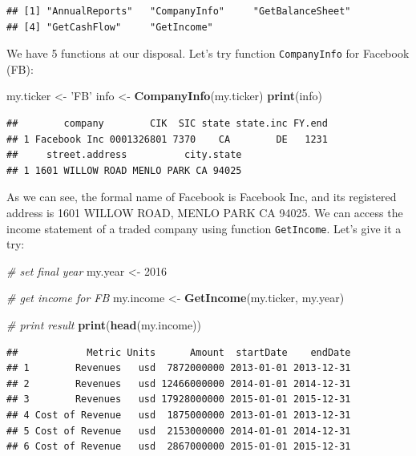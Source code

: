 \documentclass[11pt,]{book}
\newenvironment{Shaded}{\begin{snugshade}}{\end{snugshade}}
\newcommand{\KeywordTok}[1]{\textcolor[rgb]{0.27,0.27,0.27}{\textbf{#1}}}
\newcommand{\DecValTok}[1]{\textcolor[rgb]{0.06,0.06,0.06}{#1}}
\newcommand{\StringTok}[1]{\textcolor[rgb]{0.5,0.5,0.5}{#1}}
\newcommand{\CommentTok}[1]{\textcolor[rgb]{0.56,0.35,0.01}{\textit{#1}}}
\newcommand{\NormalTok}[1]{#1}
\begin{document}
\begin{verbatim}
## [1] "AnnualReports"   "CompanyInfo"     "GetBalanceSheet"
## [4] "GetCashFlow"     "GetIncome"
\end{verbatim}

We have 5 functions at our disposal. Let's try function
\texttt{CompanyInfo} for Facebook (FB):

\begin{Shaded}
\begin{Highlighting}[]
\NormalTok{my.ticker <-}\StringTok{ 'FB'}
\NormalTok{info <-}\StringTok{ }\KeywordTok{CompanyInfo}\NormalTok{(my.ticker)}
\KeywordTok{print}\NormalTok{(info)}
\end{Highlighting}
\end{Shaded}

\begin{verbatim}
##        company        CIK  SIC state state.inc FY.end
## 1 Facebook Inc 0001326801 7370    CA        DE   1231
##     street.address          city.state
## 1 1601 WILLOW ROAD MENLO PARK CA 94025
\end{verbatim}

As we can see, the formal name of Facebook is Facebook Inc, and its
registered address is 1601 WILLOW ROAD, MENLO PARK CA 94025. We can
access the income statement of a traded company using function
\texttt{GetIncome}. Let's give it a try:

\begin{Shaded}
\begin{Highlighting}[]
\CommentTok{# set final year}
\NormalTok{my.year <-}\StringTok{ }\DecValTok{2016}

\CommentTok{# get income for FB}
\NormalTok{my.income <-}\StringTok{ }\KeywordTok{GetIncome}\NormalTok{(my.ticker, my.year)}

\CommentTok{# print result}
\KeywordTok{print}\NormalTok{(}\KeywordTok{head}\NormalTok{(my.income))}
\end{Highlighting}
\end{Shaded}

\begin{verbatim}
##            Metric Units      Amount  startDate    endDate
## 1        Revenues   usd  7872000000 2013-01-01 2013-12-31
## 2        Revenues   usd 12466000000 2014-01-01 2014-12-31
## 3        Revenues   usd 17928000000 2015-01-01 2015-12-31
## 4 Cost of Revenue   usd  1875000000 2013-01-01 2013-12-31
## 5 Cost of Revenue   usd  2153000000 2014-01-01 2014-12-31
## 6 Cost of Revenue   usd  2867000000 2015-01-01 2015-12-31
\end{verbatim}
\end{document}
